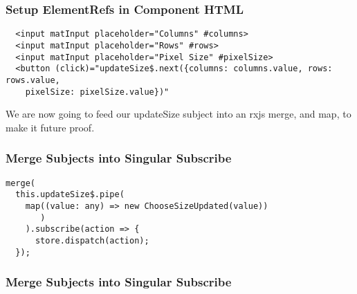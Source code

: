 \subsubsection{ Setup ElementRefs in Component HTML }
\begin{verbatim}
  <input matInput placeholder="Columns" #columns>
  <input matInput placeholder="Rows" #rows>
  <input matInput placeholder="Pixel Size" #pixelSize>
  <button (click)="updateSize$.next({columns: columns.value, rows: rows.value,
    pixelSize: pixelSize.value})"
\end{verbatim}

We are now going to feed our updateSize subject into an rxjs merge, and map,
to make it future proof.

\subsubsection{ Merge Subjects into Singular Subscribe }

\begin{lstlisting}
merge(
  this.updateSize$.pipe(
    map((value: any) => new ChooseSizeUpdated(value))
       )
    ).subscribe(action => {
      store.dispatch(action);
  });
\end{lstlisting}

\subsubsection{ Merge Subjects into Singular Subscribe }
